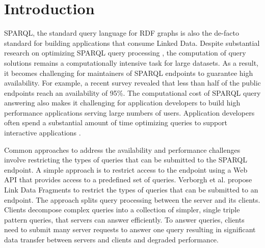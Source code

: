 \section{Introduction}
SPARQL, the standard query language for RDF graphs is also the de-facto standard for building applications that consume Linked Data. 
Despite substantial research on optimizing SPARQL query processing \cite{Pham2013}, the computation of query solutions remains a computationally intensive task for large datasets.
As a result, it becomes challenging for maintainers of SPARQL endpoints to guarantee high availability.
For example, a recent survey \cite{buil2013sparql} revealed that less than half of the public endpoints reach an availability of 95\%.
The computational cost of SPARQL query answering also makes it challenging for application developers to build high performance applications serving large numbers of users.
Application developers often spend a substantial amount of time optimizing queries to support interactive applications \cite{Loizou_Angles_Groth_2014}.

Common approaches to address the availability and performance challenges involve restricting the types of queries that can be submitted to the SPARQL endpoint.
A simple approach is to restrict access to the endpoint using a Web API \cite{Groth_Loizou_Gray_Goble_Harland_Pettifer_2014} that provides access to a predefined set of queries.
%
Verborgh et al. \cite{Verborgh2014} propose Link Data Fragments to restrict the types of queries that can be submitted to an endpoint. 
The approach splits query processing between the server and its clients.
Clients decompose complex queries into a collection of simpler, single triple pattern queries, that servers can answer efficiently.
To answer queries, clients need to submit many server requests to answer one query resulting in significant data transfer between servers and clients and degraded performance. 